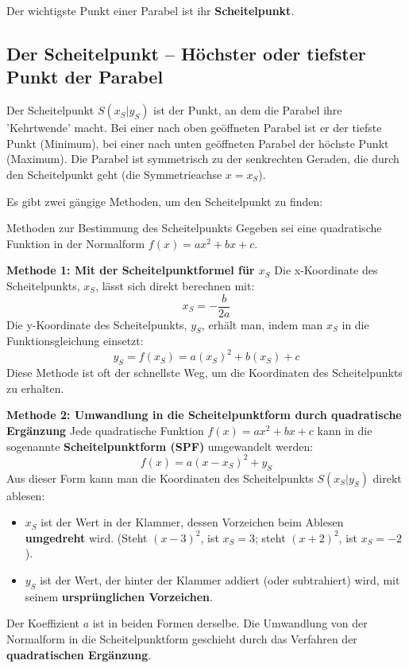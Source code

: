 Der wichtigste Punkt einer Parabel ist ihr \textbf{Scheitelpunkt}.

\subsection{Der Scheitelpunkt – Höchster oder tiefster Punkt der Parabel}

Der Scheitelpunkt $S(x_S|y_S)$ ist der Punkt, an dem die Parabel ihre 'Kehrtwende' macht. Bei einer nach oben geöffneten Parabel ist er der tiefste Punkt (Minimum), bei einer nach unten geöffneten Parabel der höchste Punkt (Maximum). Die Parabel ist symmetrisch zu der senkrechten Geraden, die durch den Scheitelpunkt geht (die Symmetrieachse $x=x_S$).

Es gibt zwei gängige Methoden, um den Scheitelpunkt zu finden:

\begin{merksatzumgebung}{Methoden zur Bestimmung des Scheitelpunkts}
Gegeben sei eine quadratische Funktion in der Normalform $f(x) = ax^2 + bx + c$.

\textbf{Methode 1: Mit der Scheitelpunktformel für $x_S$}
Die x-Koordinate des Scheitelpunkts, $x_S$, lässt sich direkt berechnen mit:
\[ x_S = -\frac{b}{2a} \]
Die y-Koordinate des Scheitelpunkts, $y_S$, erhält man, indem man $x_S$ in die Funktionsgleichung einsetzt:
\[ y_S = f(x_S) = a(x_S)^2 + b(x_S) + c \]
Diese Methode ist oft der schnellste Weg, um die Koordinaten des Scheitelpunkts zu erhalten.

\textbf{Methode 2: Umwandlung in die Scheitelpunktform durch quadratische Ergänzung}
Jede quadratische Funktion $f(x) = ax^2 + bx + c$ kann in die sogenannte \textbf{Scheitelpunktform (SPF)} umgewandelt werden:
\[ f(x) = a(x - x_S)^2 + y_S \]
Aus dieser Form kann man die Koordinaten des Scheitelpunkts $S(x_S|y_S)$ direkt ablesen:
\begin{itemize}
    \item $x_S$ ist der Wert in der Klammer, dessen Vorzeichen beim Ablesen \textbf{umgedreht} wird. (Steht $(x-3)^2$, ist $x_S=3$; steht $(x+2)^2$, ist $x_S=-2$).
    \item $y_S$ ist der Wert, der hinter der Klammer addiert (oder subtrahiert) wird, mit seinem \textbf{ursprünglichen Vorzeichen}.
\end{itemize}
Der Koeffizient $a$ ist in beiden Formen derselbe. Die Umwandlung von der Normalform in die Scheitelpunktform geschieht durch das Verfahren der \textbf{quadratischen Ergänzung}.
\end{merksatzumgebung}


